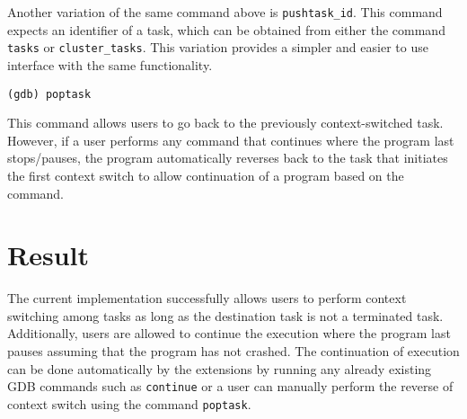 Another variation of the same command above is \verb|pushtask_id|. This command
expects an identifier of a task, which can be obtained from either the command \verb|tasks| or
\verb|cluster_tasks|. This variation provides a simpler and easier to use
interface with the same functionality.

\begin{lstlisting}[caption={\text{poptask} command}, label={poptask}]
(gdb) poptask
\end{lstlisting}

This command allows users to go back to the previously context-switched task.
However, if a user performs any command that continues where the program last
stops/pauses, the program automatically reverses back to the task that initiates
the first context switch to allow continuation of a program based on the
command.

\section{Result}
The current implementation successfully allows users to perform context
switching among tasks as long as the destination task is not a terminated
task. Additionally, users are allowed to continue the execution where the
program last pauses assuming that the program has not crashed. The continuation
of execution can be done automatically by the extensions by running any already
existing GDB commands such as \verb|continue| or a user can manually
perform the reverse of context switch using the command \verb|poptask|.
